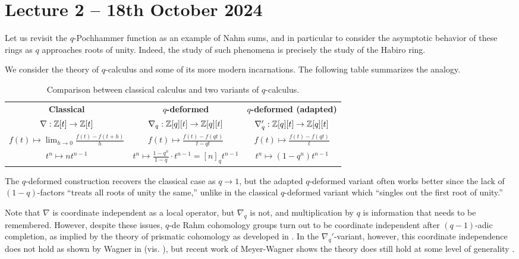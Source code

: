 \section{Lecture 2 -- 18th October 2024}\label{sec: lecture 2}
Let us revisit the $q$-Pochhammer function as an example of Nahm sums, and in particular to consider the asymptotic behavior of these rings as $q$ approaches roots of unity. Indeed, the study of such phenomena is precisely the study of the Habiro ring. 

We consider the theory of $q$-calculus and some of its more modern incarnations. The following table summarizes the analogy.

\begin{table}[h]\label{table: q-calculus comparison}
    \begin{tabular}{c c c}
        \textbf{Classical} & \textbf{$q$-deformed} & \textbf{$q$-deformed (adapted)}\\
        $\nabla:\mathbb{Z}[t]\to\mathbb{Z}[t]$ & $\nabla_{q}:\mathbb{Z}[q][t]\to\mathbb{Z}[q][t]$ & $\nabla_{q}':\mathbb{Z}[q][t]\to\mathbb{Z}[q][t]$ \\
        $f(t)\mapsto\lim_{h\to 0}\frac{f(t)-f(t+h)}{h}$ & $f(t)\mapsto\frac{f(t)-f(qt)}{t-qt}$ & $f(t)\mapsto\frac{f(t)-f(qt)}{t}$\\
        $t^{n}\mapsto nt^{n-1}$ & $t^{n}\mapsto \frac{1-q^{n}}{1-q}\cdot t^{n-1}=[n]_{q}t^{n-1}$ & $t^{n}\mapsto (1-q^{n})t^{n-1}$\\
    \end{tabular}
    \caption{Comparison between classical calculus and two variants of $q$-calculus.}
\end{table}
The $q$-deformed construction recovers the classical case as $q\to1$, but the adapted $q$-deformed variant often works better since the lack of $(1-q)$-factors ``treats all roots of unity the same,'' unlike in the classical $q$-deformed variant which ``singles out the first root of unity.''

Note that $\nabla$ is coordinate independent as a local operator, but $\nabla_{q}$ is not, and multiplication by $q$ is information that needs to be remembered. However, despite these issues, $q$-de Rahm cohomology groups turn out to be coordinate independent after $(q-1)$-adic completion, as implied by the theory of prismatic cohomology as developed in \cite{PrismsPrismatic}. In the $\nabla_{q}'$-variant, however, this coordinate independence does not hold as shown by Wagner in \cite{WagnerMSThesis} (vis. \cite{WagnerQWittQHodge}), but recent work of Meyer-Wagner shows the theory does still hold at some level of generality \cite{MeyerWagner}.

